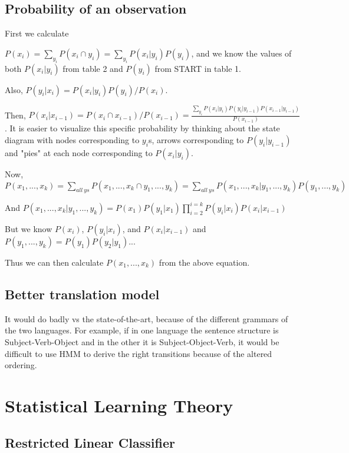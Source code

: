 \documentclass[]{article}
\begin{document}
\subsection{Probability of an observation}

First we calculate 

$P(x_i) = \sum_{y_i} P(x_i \cap y_i) = \sum_{y_i} P(x_i|y_i)P(y_i)$, and we know the values of both $P(x_i|y_i)$ from table 2 and $P(y_i)$ from START in table 1.

Also, $P(y_i|x_i) = P(x_i|y_i)P(y_i)/P(x_i)$.

Then, $P(x_i|x_{i-1}) = P(x_i \cap x_{i-1}) / P(x_{i-1}) = \frac{\sum_{y_i} P(x_i|y_i)P(y_i|y_{i-1})P(x_{i-1}|y_{i-1})}{P(x_{i-1})}$. It is easier to visualize this specific probability by thinking about the state diagram with nodes corresponding to $y_i$s, arrows corresponding to $P(y_i|y_{i-1})$ and "pies" at each node corresponding to $P(x_i|y_i)$.

Now, $P(x_1,...,x_k) = \sum_{all~ys} P(x_1,...,x_k \cap y_1,...,y_k) = \sum_{all~ys}P(x_1,...,x_k|y_1,...,y_k)P(y_1,...,y_k)$

And $P(x_1,...,x_k|y_1,...,y_k) = P(x_1)P(y_1|x_1)\prod_{i=2}^{i=k} P(y_i|x_i)P(x_i|x_{i-1})$

But we know $P(x_i)$, $P(y_i|x_i)$, and $P(x_i|x_{i-1})$ and $P(y_1,...,y_k) = P(y_1)P(y_2|y_1)...$

Thus we can then calculate $P(x_1,...,x_k)$ from the above equation.

\subsection{Better translation model}

It would do badly vs the state-of-the-art, because of the different grammars of the two languages. For example, if in one language the sentence structure is Subject-Verb-Object and in the other it is Subject-Object-Verb, it would be difficult to use HMM to derive the right transitions because of the altered ordering.

\section{Statistical Learning Theory}

\subsection{Restricted Linear Classifier}
\end{document}
